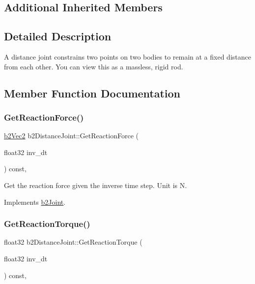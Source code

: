 \subsection*{Additional Inherited Members}


\subsection{Detailed Description}
A distance joint constrains two points on two bodies to remain at a fixed distance from each other. You can view this as a massless, rigid rod. 

\subsection{Member Function Documentation}
\mbox{\label{classb2DistanceJoint_a6aa951e5bbfcae8a617987955cadbed5}} 
\subsubsection{\texorpdfstring{Get\+Reaction\+Force()}{GetReactionForce()}}
{\footnotesize\ttfamily \mbox{\hyperlink{structb2Vec2}{b2\+Vec2}} b2\+Distance\+Joint\+::\+Get\+Reaction\+Force (\begin{DoxyParamCaption}\item[{float32}]{inv\+\_\+dt }\end{DoxyParamCaption}) const\hspace{0.3cm}{\ttfamily [override]}, {\ttfamily [virtual]}}

Get the reaction force given the inverse time step. Unit is N. 

Implements \mbox{\hyperlink{classb2Joint_a7e0eddefb9b69ad050b8ef6425838a74}{b2\+Joint}}.

\mbox{\label{classb2DistanceJoint_ad7ac78c4c20c122b944947d523a02982}} 
\subsubsection{\texorpdfstring{Get\+Reaction\+Torque()}{GetReactionTorque()}}
{\footnotesize\ttfamily float32 b2\+Distance\+Joint\+::\+Get\+Reaction\+Torque (\begin{DoxyParamCaption}\item[{float32}]{inv\+\_\+dt }\end{DoxyParamCaption}) const\hspace{0.3cm}{\ttfamily [override]}, {\ttfamily [virtual]}}

